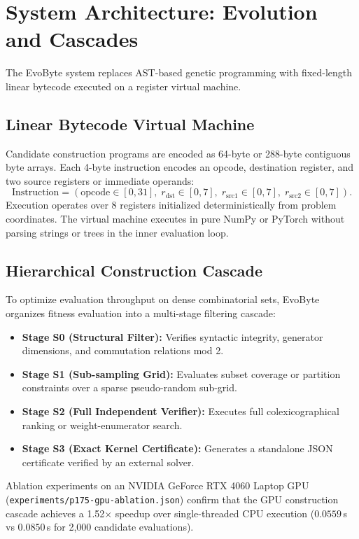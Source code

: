 \documentclass[11pt,a4paper]{article}
\begin{document}
\section{System Architecture: Evolution and Cascades}
\label{sec:architecture}
The EvoByte system replaces AST-based genetic programming \cite{koza1992genetic} with fixed-length linear bytecode executed on a register virtual machine.

\subsection{Linear Bytecode Virtual Machine}
Candidate construction programs are encoded as 64-byte or 288-byte contiguous byte arrays. Each 4-byte instruction encodes an opcode, destination register, and two source registers or immediate operands:
\begin{equation}
    \text{Instruction} = (\text{opcode} \in [0, 31], \; r_{\text{dst}} \in [0, 7], \; r_{\text{src1}} \in [0, 7], \; r_{\text{src2}} \in [0, 7]).
\end{equation}
Execution operates over 8 registers initialized deterministically from problem coordinates. The virtual machine executes in pure NumPy or PyTorch without parsing strings or trees in the inner evaluation loop.

\subsection{Hierarchical Construction Cascade}
To optimize evaluation throughput on dense combinatorial sets, EvoByte organizes fitness evaluation into a multi-stage filtering cascade:
\begin{itemize}
    \item \textbf{Stage S0 (Structural Filter):} Verifies syntactic integrity, generator dimensions, and commutation relations mod 2.
    \item \textbf{Stage S1 (Sub-sampling Grid):} Evaluates subset coverage or partition constraints over a sparse pseudo-random sub-grid.
    \item \textbf{Stage S2 (Full Independent Verifier):} Executes full colexicographical ranking or weight-enumerator search.
    \item \textbf{Stage S3 (Exact Kernel Certificate):} Generates a standalone JSON certificate verified by an external solver.
\end{itemize}
Ablation experiments on an NVIDIA GeForce RTX 4060 Laptop GPU (\texttt{experiments/p175-gpu-ablation.json}) confirm that the GPU construction cascade achieves a 1.52$\times$ speedup over single-threaded CPU execution ($0.0559$\,s vs $0.0850$\,s for 2,000 candidate evaluations).
\end{document}

